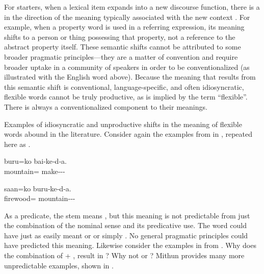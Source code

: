 For starters, when a lexical item expands into a new discourse function, there is a  in the direction of the meaning typically associated with the new context \parencites[74--77]{Croft1991}[73]{Croft2001b}. For example, when a property word is used in a referring expression, its meaning shifts to a person or thing possessing that property, not a reference to the abstract property itself. These semantic shifts cannot be attributed to some broader pragmatic principles—they are a matter of convention and require broader uptake in a community of speakers in order to be conventionalized (as illustrated with the English word  above). Because the meaning that results from this semantic shift is conventional, language-specific, and often idiosyncratic, flexible words cannot be truly productive, as is implied by the term \enquote{flexible}. There is always a conventionalized component to their meanings.

Examples of idiosyncratic and unproductive shifts in the meaning of flexible words abound in the literature. Consider again the examples from  in , repeated here as .

\begin{exe}
  \ex\label{ex:2.16}
  \begin{xlist}

    \ex
    \gll buru=ko                bai‑ke‑d‑a.\\
         mountain= make‑‑‑\\

    \ex
    \gll saan=ko                buru‑ke‑d‑a.\\
         firewood= mountain‑‑‑\\

  \end{xlist}
\end{exe}

\noindent As a predicate, the stem  means , but this meaning is not predictable from just the combination of the nominal sense  and its predicative use. The word could have just as easily meant  or  or simply . No general pragmatic principles could have predicted this meaning. Likewise consider the  examples in  from . Why does the combination of   +  ,  result in  ? Why not  or ? Mithun provides many more unpredictable examples, shown in .

